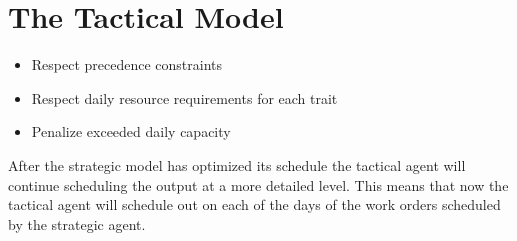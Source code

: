 \section{The Tactical Model}
\begin{itemize}
	\item Respect precedence constraints
	\item Respect daily resource requirements for each trait
	\item Penalize exceeded daily capacity
\end{itemize}

After the strategic model has optimized its schedule the tactical agent will continue scheduling the output at a more detailed level. This means that now the tactical agent will schedule 
out on each of the days of the work orders scheduled by the strategic agent. 

